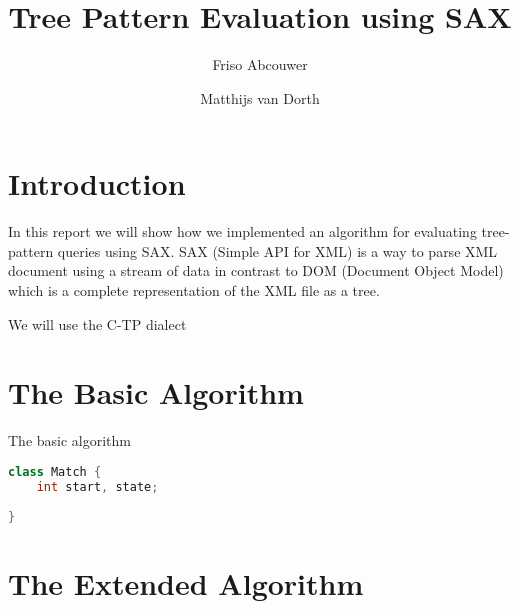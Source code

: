 \documentclass[12pt]{article}
\title{Tree Pattern Evaluation using SAX}
\author{Friso Abcouwer \and Matthijs van Dorth}
\begin{document}
\maketitle

\section{Introduction}
In this report we will show how we implemented an algorithm for evaluating tree-pattern queries using SAX. SAX (Simple API for XML) is a way to parse XML document using a stream of data in contrast to DOM (Document Object Model) which is a complete representation of the XML file as a tree.

We will use the C-TP dialect

\section{The Basic Algorithm}
The basic algorithm 

\begin{lstlisting}[language=java, caption=Match.java]
class Match {
    int start, state;
    
}
\end{lstlisting}

\section{The Extended Algorithm}
\end{document}
